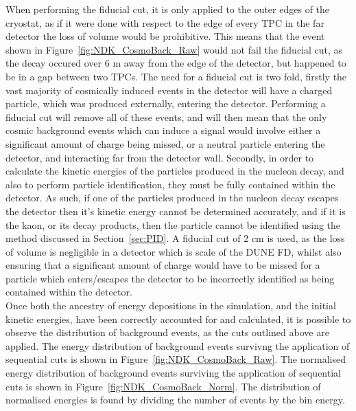 When performing the fiducial cut, it is only applied to the outer edges of the cryostat, as if it were done with respect to the edge of every TPC in the far detector the loss of volume would be prohibitive. This means that the event shown in Figure~\ref{fig:NDK_CosmoBack_Raw} would not fail the fiducial cut, as the decay occured over 6 m away from the edge of the detector, but happened to be in a gap between two TPCs. The need for a fiducial cut is two fold, firstly the vast majority of cosmically induced events in the detector will have a charged particle, which was produced externally, entering the detector. Performing a fiducial cut will remove all of these events, and will then mean that the only cosmic background events which can induce a signal would involve either a significant amount of charge being missed, or a neutral particle entering the detector, and interacting far from the detector wall. Secondly, in order to calculate the kinetic energies of the particles produced in the nucleon decay, and also to perform particle identification, they must be fully contained within the detector. As such, if one of the particles produced in the nucleon decay escapes the detector then it's kinetic energy cannot be determined accurately, and if it is the kaon, or its decay products, then the particle cannot be identified using the method discussed in Section~\ref{sec:PID}. A fiducial cut of 2 cm is used, as the loss of volume is negligible in a detector which is scale of the DUNE FD, whilst also ensuring that a significant amount of charge would have to be missed for a particle which enters/escapes the detector to be incorrectly identified as being contained within the detector. \\

Once both the ancestry of energy depositions in the simulation, and the initial kinetic energies, have been correctly accounted for and calculated, it is possible to observe the distribution of background events, as the cuts outlined above are applied. The energy distribution of background events survivng the application of sequential cuts is shown in Figure~\ref{fig:NDK_CosmoBack_Raw}. The normalised energy distribution of background events surviving the application of sequential cuts is shown in Figure~\ref{fig:NDK_CosmoBack_Norm}. The distribution of normalised energies is found by dividing the number of events by the bin energy. \\

